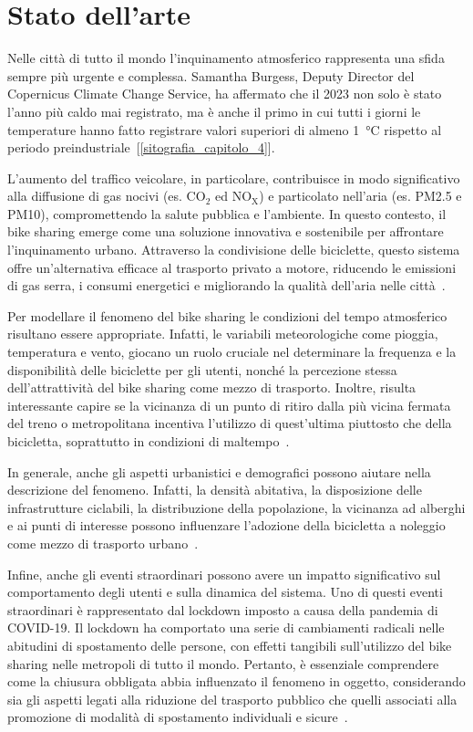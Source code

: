 \section[Stato dell'arte]{Stato dell'arte}
Nelle città di tutto il mondo l'inquinamento atmosferico rappresenta una sfida sempre più urgente e complessa. Samantha Burgess, Deputy Director del Copernicus Climate Change Service, ha affermato che il 2023 non solo è stato l'anno più caldo mai registrato, ma è anche il primo in cui tutti i giorni le temperature hanno fatto registrare valori superiori di almeno \SI{1}{\degreeCelsius} rispetto al periodo preindustriale~[\ref{sitografia_capitolo_4}].
\par L'aumento del traffico veicolare, in particolare, contribuisce in modo significativo alla diffusione di gas nocivi (es. CO$_2$ ed NO$_\text{X}$) e particolato nell'aria (es. PM\num{2.5} e PM\num{10}), compromettendo la salute pubblica e l'ambiente. In questo contesto, il bike sharing emerge come una soluzione innovativa e sostenibile per affrontare l'inquinamento urbano. Attraverso la condivisione delle biciclette, questo sistema offre un'alternativa efficace al trasporto privato a motore, riducendo le emissioni di gas serra, i consumi energetici e migliorando la qualità dell'aria nelle città~\citep{paper_bike_sharing_e_ambiente}.
\par Per modellare il fenomeno del bike sharing le condizioni del tempo atmosferico risultano essere appropriate. Infatti, le variabili meteorologiche come pioggia, temperatura e vento, giocano un ruolo cruciale nel determinare la frequenza e la disponibilità delle biciclette per gli utenti, nonché la percezione stessa dell'attrattività del bike sharing come mezzo di trasporto. Inoltre, risulta interessante capire se la vicinanza di un punto di ritiro dalla più vicina fermata del treno o metropolitana incentiva l'utilizzo di quest'ultima piuttosto che della bicicletta, soprattutto in condizioni di maltempo~\citep{paper_bike_sharing_e_meteo}.
\par In generale, anche gli aspetti urbanistici e demografici possono aiutare nella descrizione del fenomeno. Infatti, la densità abitativa, la disposizione delle infrastrutture ciclabili, la distribuzione della popolazione, la vicinanza ad alberghi e ai punti di interesse possono influenzare l'adozione della bicicletta a noleggio come mezzo di trasporto urbano~\citep{paper_bike_sharing_e_popolazione}.
\par Infine, anche gli eventi straordinari possono avere un impatto significativo sul comportamento degli utenti e sulla dinamica del sistema. Uno di questi eventi straordinari è rappresentato dal lockdown imposto a causa della pandemia di COVID-\num{19}. Il lockdown ha comportato una serie di cambiamenti radicali nelle abitudini di spostamento delle persone, con effetti tangibili sull'utilizzo del bike sharing nelle metropoli di tutto il mondo. Pertanto, è essenziale comprendere come la chiusura obbligata abbia influenzato il fenomeno in oggetto, considerando sia gli aspetti legati alla riduzione del trasporto pubblico che quelli associati alla promozione di modalità di spostamento individuali e sicure~\citep{paper_bike_sharing_e_covid}.
